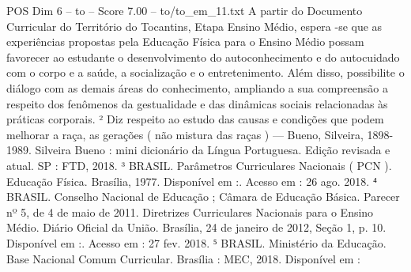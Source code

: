\begin{textsample}{POS Dim 6 – to – Score 7.00 – to/to\_em\_11.txt}
A partir do Documento Curricular do Território do Tocantins, Etapa Ensino Médio, espera -se que as experiências propostas pela Educação Física para o Ensino Médio possam favorecer ao estudante o desenvolvimento do autoconhecimento e do autocuidado com o corpo e a saúde, a socialização e o entretenimento.
Além disso, possibilite o diálogo com as demais áreas do conhecimento, ampliando a sua compreensão a respeito dos fenômenos da gestualidade e das dinâmicas sociais relacionadas às práticas corporais. ² Diz respeito ao estudo das causas e condições que podem melhorar a raça, as gerações ( não mistura das raças ) — Bueno, Silveira, 1898-1989.
Silveira Bueno : mini dicionário da Língua Portuguesa.
Edição revisada e atual.
SP : FTD, 2018. ³ BRASIL.
Parâmetros Curriculares Nacionais ( PCN ).
Educação Física.
Brasília, 1977.
Disponível em :.
Acesso em : 26 ago. 2018. ⁴ BRASIL.
Conselho Nacional de Educação ; Câmara de Educação Básica.
Parecer nº 5, de 4 de maio de 2011.
Diretrizes Curriculares Nacionais para o Ensino Médio.
Diário Oficial da União.
Brasília, 24 de janeiro de 2012, Seção 1, p. 10.
Disponível em :.
Acesso em : 27 fev. 2018. ⁵ BRASIL.
Ministério da Educação.
Base Nacional Comum Curricular.
Brasília : MEC, 2018.
Disponível em :

\end{textsample}
